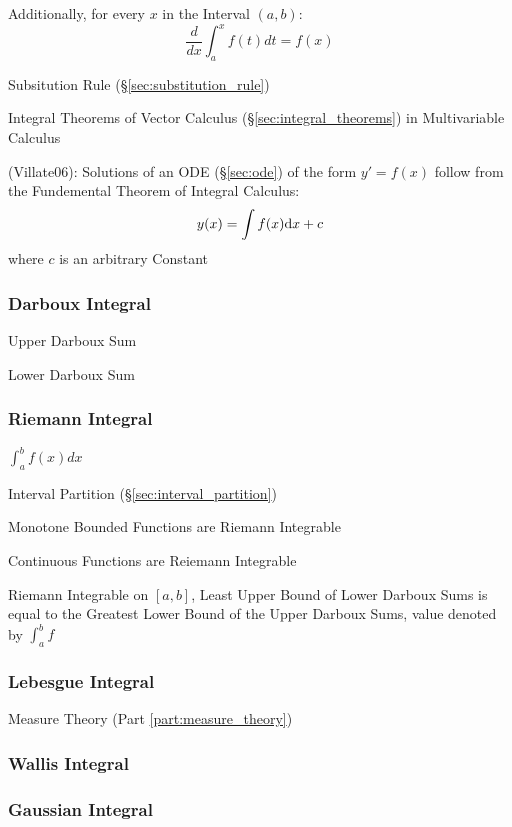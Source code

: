 Additionally, for every $x$ in the Interval $(a,b)$:
\[
  \frac{d}{dx}\int^x_a f(t) dt = f(x)
\]

\fist Subsitution Rule (\S\ref{sec:substitution_rule})

\fist Integral Theorems of Vector Calculus
(\S\ref{sec:integral_theorems}) in Multivariable Calculus

(Villate06): Solutions of an ODE (\S\ref{sec:ode}) of the form $y' = f(x)$
follow from the Fundemental Theorem of Integral Calculus:
\[
  y(x) = \int f(x) \mathrm{d}x + c
\]
where $c$ is an arbitrary Constant



\subsubsection{Darboux Integral}\label{sec:darboux_integral}

Upper Darboux Sum

Lower Darboux Sum



\subsubsection{Riemann Integral}\label{sec:riemann_integral}

$\int_a^b f(x) dx$

Interval Partition (\S\ref{sec:interval_partition})

Monotone Bounded Functions are Riemann Integrable

Continuous Functions are Reiemann Integrable

Riemann Integrable on $[a,b]$, Least Upper Bound of Lower Darboux Sums
is equal to the Greatest Lower Bound of the Upper Darboux Sums, value
denoted by $\int_a^b f$



\subsubsection{Lebesgue Integral}\label{sec:lebesgue_integral}

\fist Measure Theory (Part \ref{part:measure_theory})



\subsubsection{Wallis Integral}\label{sec:wallis_integral}

\subsubsection{Gaussian Integral}\label{sec:gaussian_integral}

